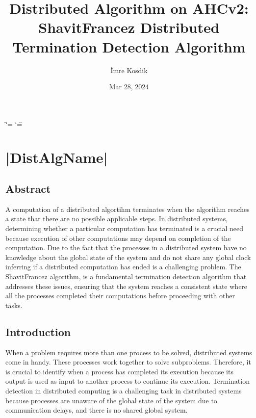 \documentclass[letterpaper,10pt,english]{sphinxmanual}
\title{Distributed Algorithm on AHCv2: Shavit\sphinxhyphen{}Francez Distributed Termination Detection Algorithm}
\date{Mar 28, 2024}
\author{İmre Kosdik}
\begin{document}
\ifdefined\shorthandoff
  \ifnum\catcode`\=\string=\active\shorthandoff{=}\fi
  \ifnum\catcode`\"=\active{}\fi
\fi

\pagestyle{empty}
\sphinxmaketitle
\pagestyle{plain}
\sphinxtableofcontents
\pagestyle{normal}
\label{\detokenize{index::doc}}


\sphinxstepscope


\chapter{{\color{red}\bfseries{}|DistAlgName|}}
\label{\detokenize{docs/ShavitFranchezAlg/ShavitFranchezAlg:distalgname}}\label{\detokenize{docs/ShavitFranchezAlg/ShavitFranchezAlg::doc}}
\sphinxstepscope


\section{Abstract}
\label{\detokenize{docs/ShavitFranchezAlg/abstract:abstract}}\label{\detokenize{docs/ShavitFranchezAlg/abstract::doc}}
\sphinxAtStartPar
A computation of a distributed algortihm terminates when the algorithm reaches a state that there are no possible applicable steps. In distributed systems, determining whether a particular computation has terminated is a crucial need because execution of other computations may depend on completion of the computation. Due to the fact that the processes in a distributed system have no knowledge about the global state of the system and do not share any global clock inferring if a distributed computation has ended is a challenging problem. The Shavit\sphinxhyphen{}Francez algorithm, is a fundamental termination detection algorithm that addresses these issues, ensuring that the system reaches a consistent state where all the processes completed their computations before proceeding with other tasks.

\sphinxstepscope


\section{Introduction}
\label{\detokenize{docs/ShavitFranchezAlg/introduction:introduction}}\label{\detokenize{docs/ShavitFranchezAlg/introduction::doc}}
\sphinxAtStartPar
When a problem requires more than one process to be solved, distributed systems come in handy. These processes work together to solve subproblems. Therefore, it is crucial to identify when a process has completed its execution because its output is used as input to another process to continue its execution. Termination detection in distributed computing is a challenging task in distributed systems because processes are unaware of the global state of the system due to communication delays, and there is no shared global system.
\end{document}
